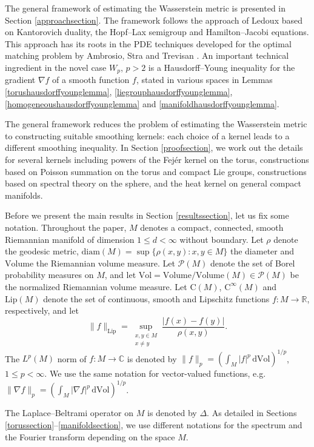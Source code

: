 \documentclass[11pt,a4paper]{article}
\theoremstyle{definition}
\begin{document}
The general framework of estimating the Wasserstein metric is presented in Section \ref{approachsection}. The framework follows the approach of Ledoux \cite{LE1} based on Kantorovich duality, the Hopf--Lax semigroup and Hamilton--Jacobi equations. This approach has its roots in the PDE techniques developed for the optimal matching problem by Ambrosio, Stra and Trevisan \cite{AST}. An important technical ingredient in the novel case $W_p$, $p>2$ is a Hausdorff--Young inequality for the gradient $\nabla f$ of a smooth function $f$, stated in various spaces in Lemmas \ref{torushausdorffyounglemma}, \ref{liegrouphausdorffyounglemma}, \ref{homogeneoushausdorffyounglemma} and \ref{manifoldhausdorffyounglemma}.

The general framework reduces the problem of estimating the Wasserstein metric to constructing suitable smoothing kernels: each choice of a kernel leads to a different smoothing inequality. In Section \ref{proofsection}, we work out the details for several kernels including powers of the Fej\'er kernel on the torus, constructions based on Poisson summation on the torus and compact Lie groups, constructions based on spectral theory on the sphere, and the heat kernel on general compact manifolds.

Before we present the main results in Section \ref{resultssection}, let us fix some notation. Throughout the paper, $M$ denotes a compact, connected, smooth Riemannian manifold of dimension $1 \le d < \infty$ without boundary. Let $\rho$ denote the geodesic metric, $\mathrm{diam}(M)=\sup \{ \rho (x,y) : x, y \in M \}$ the diameter and $\mathrm{Volume}$ the Riemannian volume measure. Let $\mathcal{P}(M)$ denote the set of Borel probability measures on $M$, and let $\mathrm{Vol}=\mathrm{Volume}/\mathrm{Volume}(M)\in \mathcal{P}(M)$ be the normalized Riemannian volume measure. Let $\mathrm{C}(M)$, $\mathrm{C}^{\infty}(M)$ and $\mathrm{Lip}(M)$ denote the set of continuous, smooth and Lipschitz functions $f: M \to \mathbb{R}$, respectively, and let
\[ \| f \|_{\mathrm{Lip}} = \sup_{\substack{x,y \in M \\ x \neq y}} \frac{|f(x)-f(y)|}{\rho (x,y)} . \]
The $L^p (M)$ norm of $f:M \to \mathbb{C}$ is denoted by $\| f \|_p=(\int_M |f|^p \, \mathrm{d}\mathrm{Vol})^{1/p}$, $1 \le p < \infty$. We use the same notation for vector-valued functions, e.g.\ $\| \nabla f \|_p = (\int_M |\nabla f|^p \, \mathrm{d}\mathrm{Vol})^{1/p}$.

The Laplace--Beltrami operator on $M$ is denoted by $\Delta$. As detailed in Sections \ref{torussection}--\ref{manifoldsection}, we use different notations for the spectrum and the Fourier transform depending on the space $M$.
\end{document}
